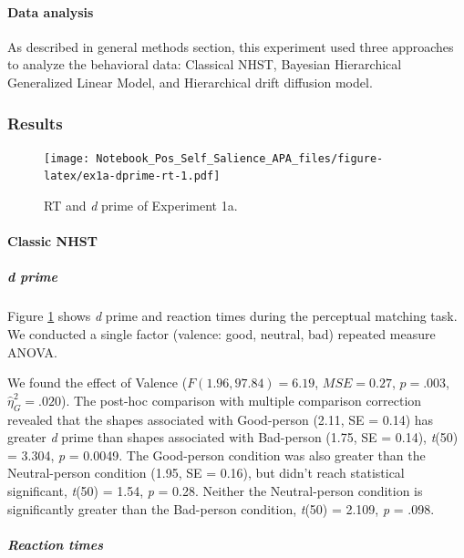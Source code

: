 \documentclass[
  english,
  man]{apa6}
\let\oldparagraph\paragraph
\renewcommand{\paragraph}[1]{\oldparagraph{#1}\mbox{}}
\let\oldsubparagraph\subparagraph
\renewcommand{\subparagraph}[1]{\oldsubparagraph{#1}\mbox{}}
\begin{document}
\hypertarget{data-analysis-1}{%
\paragraph{Data analysis}\label{data-analysis-1}}

As described in general methods section, this experiment used three approaches to analyze the behavioral data: Classical NHST, Bayesian Hierarchical Generalized Linear Model, and Hierarchical drift diffusion model.

\hypertarget{results}{%
\subsubsection{Results}\label{results}}

\begin{figure}
\centering
\texttt{[image: Notebook\_Pos\_Self\_Salience\_APA\_files/figure-latex/ex1a-dprime-rt-1.pdf]}
\caption{\label{fig:ex1a-dprime-rt}RT and \emph{d} prime of Experiment 1a.}
\end{figure}

\hypertarget{classic-nhst-1}{%
\paragraph{Classic NHST}\label{classic-nhst-1}}

\hypertarget{d-prime}{%
\subparagraph{\texorpdfstring{\emph{d} prime}{d prime}}\label{d-prime}}

Figure \ref{fig:ex1a-dprime-rt} shows \emph{d} prime and reaction times during the perceptual matching task. We conducted a single factor (valence: good, neutral, bad) repeated measure ANOVA.

We found the effect of Valence (\(F(1.96, 97.84) = 6.19\), \(\mathit{MSE} = 0.27\), \(p = .003\), \(\hat{\eta}^2_G = .020\)). The post-hoc comparison with multiple comparison correction revealed that the shapes associated with Good-person (2.11, SE = 0.14) has greater \emph{d} prime than shapes associated with Bad-person (1.75, SE = 0.14), \emph{t}(50) = 3.304, \emph{p} = 0.0049. The Good-person condition was also greater than the Neutral-person condition (1.95, SE = 0.16), but didn't reach statistical significant, \emph{t}(50) = 1.54, \emph{p} = 0.28. Neither the Neutral-person condition is significantly greater than the Bad-person condition, \emph{t}(50) = 2.109, \emph{p} = .098.

\hypertarget{reaction-times}{%
\subparagraph{Reaction times}\label{reaction-times}}
\end{document}
